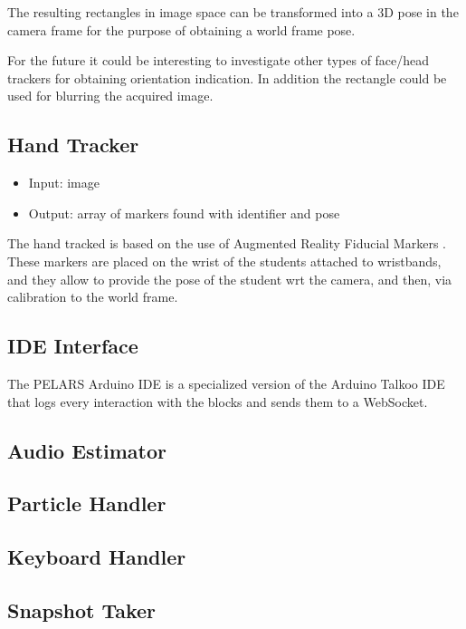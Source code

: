 \documentclass[a4paper,notitlepage,onecolumn]{hitec}  %
\begin{document}
The resulting rectangles in image space can be transformed into a 3D pose in the camera frame for the purpose of obtaining a world frame pose. 

For the future it could be interesting to investigate other types of face/head trackers for obtaining orientation indication. In addition the rectangle could be used for blurring the acquired image.


\subsection{Hand Tracker}

\begin{itemize}
	\item Input: image
	\item Output: array of markers found with identifier and pose
\end{itemize}

The hand tracked is based on the use of Augmented Reality Fiducial Markers \cite{Aruco2014}. These markers are placed on the wrist of the students attached to wristbands, and they allow to provide the pose of the student wrt the camera, and then, via calibration to the world frame.

\subsection{IDE Interface}

The PELARS Arduino IDE is a specialized version of the Arduino Talkoo IDE that logs every interaction with the blocks and sends them to a WebSocket. 

\subsection{Audio Estimator}

\subsection{Particle Handler}

\subsection{Keyboard Handler}

\subsection{Snapshot Taker}
\end{document}
